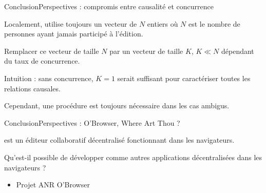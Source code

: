 \begin{frame}{Conclusion}{Perspectives : compromis entre causalité et concurrence}
  
  Localement, \CRATE utilise toujours un vecteur de $N$ entiers où $N$ est le
  nombre de personnes ayant jamais participé à l'édition.
  
  \vspace{0.5cm}

  Remplacer ce vecteur de taille $N$ par un vecteur de taille $K$, $K\ll N$
  dépendant du taux de concurrence.

  \vspace{0.5cm}

  Intuition : sans concurrence, $K=1$ serait suffisant pour caractériser toutes
  les relations causales.

  \vspace{0.5cm}

  Cependant, une procédure est toujours nécessaire dans les cas ambigus.

\end{frame}


\begin{frame}{Conclusion}{Perspectives : O'Browser, Where Art Thou ?}

  

  \CRATE est un éditeur collaboratif décentralisé fonctionnant dans les
  navigateurs.

  \vspace{0.25cm}

  Qu'est-il possible de développer comme autres applications décentralisées dans
  les navigateurs ?

  \vspace{0.25cm}
  

  \begin{center}
    
  \end{center}

  \vspace{0.25cm}
  
  \begin{itemize}
  \item Projet ANR O'Browser
  \end{itemize}


\end{frame}